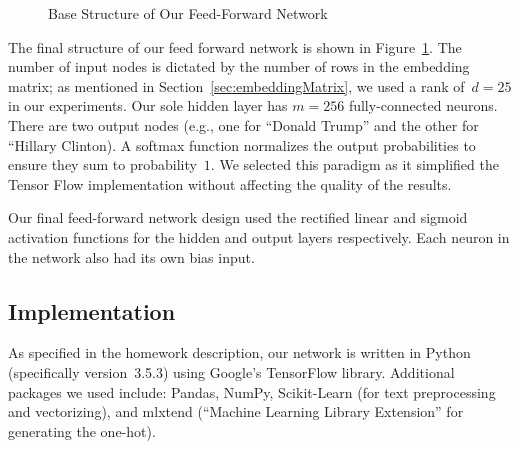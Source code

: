 \documentclass{report}
\begin{document}
\begin{figure}
    \caption{Base Structure of Our Feed-Forward Network}\label{fig:feedForwardNet}
  \end{figure}
  
  The final structure of our feed forward network is shown in Figure~\ref{fig:feedForwardNet}.  The number of input nodes is dictated by the number of rows in the embedding matrix; as mentioned in Section~\ref{sec:embeddingMatrix}, we used a rank of~$d=25$ in our experiments.  Our sole hidden layer has $m=256$ fully-connected neurons. There are two output nodes (e.g., one for ``Donald Trump'' and the other for ``Hillary Clinton).  A softmax function normalizes the output probabilities to ensure they sum to probability~$1$.  We selected this paradigm as it simplified the Tensor Flow implementation without affecting the quality of the results.
  
  Our final feed-forward network design used the rectified linear and sigmoid activation functions for the hidden and output layers respectively.  Each neuron in the network also had its own bias input.
  
  \subsection{Implementation} \label{sec:implementation}
  
  As specified in the homework description, our network is written in Python (specifically version~3.5.3) using Google's TensorFlow library.  Additional packages we used include: Pandas, NumPy, Scikit-Learn (for text preprocessing and vectorizing), and mlxtend (``Machine Learning Library Extension'' for generating the one-hot). 
  
\end{document}
